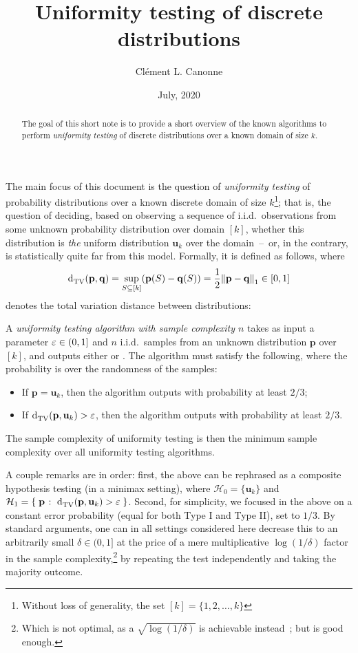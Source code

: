 \documentclass[10pt]{article}
\title{Uniformity testing of discrete distributions}
\date{July, 2020}
\author{Cl\'ement L. Canonne}
\newcommand{\dst}{\eps}
\newcommand{\ab}{k}
\newcommand{\ns}{n}
\newcommand{\errproba}{\delta}
\newcommand{\p}{\mathbf{p}}
\newcommand{\q}{\mathbf{q}}
\renewcommand{\uniform}{\mathbf{u}}
\begin{document}
\maketitle

\begin{abstract}
The goal of this short note is to provide a short overview of the known algorithms to perform \emph{uniformity testing} of discrete distributions over a known domain of size $\ab$.
\end{abstract}

The main focus of this document is the question of \emph{uniformity testing} of probability distributions over a known discrete domain of size $\ab$\footnote{Without loss of generality, the set $[\ab]=\{1,2,\dots,\ab\}$}; that is, the question of deciding, based on observing a sequence of i.i.d.\ observations from some unknown probability distribution over domain $[\ab]$, whether this distribution is \emph{the} uniform distribution $\uniform_\ab$ over the domain~--~or, in the contrary, is statistically quite far from this model. Formally, it is defined as follows, where 
\[
    \totalvardist{\p}{\q} = \sup_{S\subseteq[\ab]}(\p(S)-\q(S)) = \frac{1}{2}\normone{\p-\q} \in[0,1]
\]
denotes the total variation distance between distributions:
\begin{definition}
  A \emph{uniformity testing algorithm with sample complexity $\ns$} takes as input a parameter $\dst \in(0,1]$ and $\ns$ i.i.d.\ samples from an unknown distribution $\p$ over $[\ab]$, and outputs either \accept or \reject. The algorithm must satisfy the following, where the probability is over the randomness of the samples:
  \begin{itemize}
    \item If $\p=\uniform_\ab$, then the algorithm outputs \accept with probability at least $2/3$;
    \item If $\totalvardist{\p}{\uniform_\ab}>\dst$, then the algorithm outputs \reject with probability at least $2/3$.
  \end{itemize}
The sample complexity of uniformity testing is then the minimum sample complexity over all uniformity testing algorithms.
\end{definition}
A couple remarks are in order: first, the above can be rephrased as a composite hypothesis testing (in a minimax setting), where $\mathcal{H}_0 = \{\uniform_\ab\}$ and $\mathcal{H}_1 = \setOfSuchThat{\p}{\totalvardist{\p}{\uniform_\ab} > \dst}$. Second, for simplicity, we focused in the above on a constant error probability (equal for both Type I and Type II), set to $1/3$. By standard arguments, one can in all settings considered here decrease this to an arbitrarily small $\errproba\in(0,1]$ at the price of a mere multiplicative $\log(1/\errproba)$ factor in the sample complexity,\footnote{Which is not optimal, as a $\sqrt{\log(1/\errproba)}$ is achievable instead~\cite{DiakonikolasGPP18}; but is good enough.} by repeating the test independently and taking the majority outcome.
\end{document}
